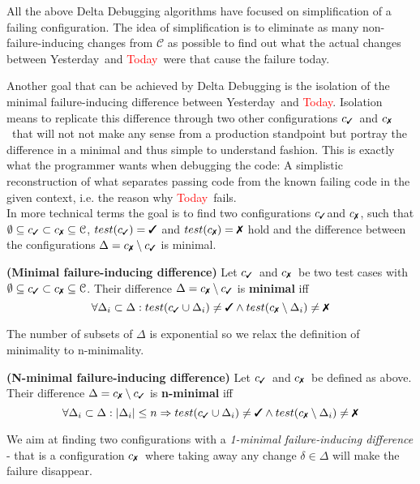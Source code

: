 \documentclass[a4paper,UKenglish]{lipics-v2018}
\newcommand{\green}[1]{\textcolor{td-green}{#1}}
\newcommand{\red}[1]{\textcolor{red}{#1}}
\newcommand{\yd}[0]{\green{Yesterday}}
\newcommand{\td}[0]{\red{Today}}
\newcommand{\C}[0]{\ensuremath{\mathcal{C}}}
\newcommand{\cmark}{\text{\ding{51}}}
\newcommand{\xmark}{\text{\ding{55}}}
\newcommand{\cpass}{\ensuremath{c_{\cmark}}}
\newcommand{\cfail}{\ensuremath{c_{\xmark}}}
\newcommand{\defsub}[1]{\textbf{(#1)} }
\begin{document}
All the above Delta Debugging algorithms have focused on simplification of a failing configuration. The idea of simplification is to eliminate as many non-failure-inducing changes from $\C$ as possible to find out what the actual changes between \yd\ and \td\ were that cause the failure today.

Another goal that can be achieved by Delta Debugging is the isolation of the minimal failure-inducing difference between \yd\ and \td. Isolation means to replicate this difference through two other configurations \cpass\ and \cfail\ that will not not make any sense from a production standpoint but portray the difference in a minimal and thus simple to understand fashion. This is exactly what the programmer wants when debugging the code: A simplistic reconstruction of what separates passing code from the known failing code in the given context, i.e. the reason why \td\ fails.\\

In more technical terms the goal is to find two configurations \cpass and \cfail, such that $\emptyset \subseteq \cpass \subset \cfail \subseteq \C$, $test(\cpass) = \cmark$ and $test(\cfail) = \xmark$ hold and the difference between the configurations $\Delta = \cfail \setminus \cpass$ is minimal.

 \label{def:minimal_difference} \defsub{Minimal failure-inducing difference} Let \cpass\ and \cfail\ be two test cases with $\emptyset \subseteq \cpass \subset \cfail \subseteq \C$. Their difference $\Delta = \cfail \setminus \cpass$ is \textbf{minimal} iff \[ \forall \Delta_i \subset \Delta : test(\cpass \cup \Delta_i) \ne \cmark \wedge test(\cfail \setminus \Delta_i) \ne \xmark \]

The number of subsets of $\Delta$ is exponential so we relax the definition of minimality to n-minimality.

 \label{def:n-minimal_difference} \defsub{N-minimal failure-inducing difference} Let \cpass\ and \cfail\ be defined as above. Their difference $\Delta = \cfail \setminus \cpass$ is \textbf{n-minimal} iff \[ \forall \Delta_i \subset \Delta : |\Delta_i| \le n \Rightarrow test(\cpass \cup \Delta_i) \ne \cmark \wedge test(\cfail \setminus \Delta_i) \ne \xmark \] 

We aim at finding two configurations with a \textit{1-minimal failure-inducing difference} - that is a configuration \cfail\ where taking away any change $\delta \in \Delta$ will make the failure disappear.\\
\end{document}
